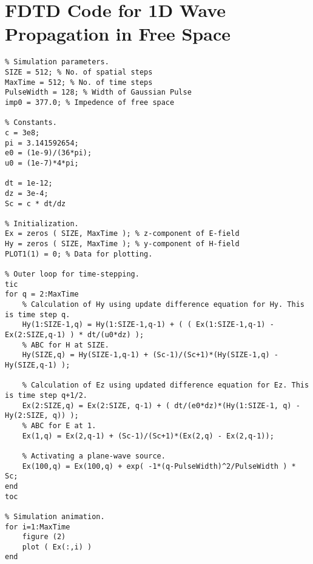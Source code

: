 \chapter{FDTD Code for 1D Wave Propagation in Free Space}
\label{App:1DFDTDFreeSpaceMatlab}
\begin{lstlisting}
% Simulation parameters.
SIZE = 512; % No. of spatial steps
MaxTime = 512; % No. of time steps
PulseWidth = 128; % Width of Gaussian Pulse
imp0 = 377.0; % Impedence of free space

% Constants.
c = 3e8;
pi = 3.141592654;
e0 = (1e-9)/(36*pi);
u0 = (1e-7)*4*pi;

dt = 1e-12;
dz = 3e-4;
Sc = c * dt/dz

% Initialization.
Ex = zeros ( SIZE, MaxTime ); % z-component of E-field
Hy = zeros ( SIZE, MaxTime ); % y-component of H-field
PLOT1(1) = 0; % Data for plotting.

% Outer loop for time-stepping.
tic
for q = 2:MaxTime
    % Calculation of Hy using update difference equation for Hy. This is time step q.
    Hy(1:SIZE-1,q) = Hy(1:SIZE-1,q-1) + ( ( Ex(1:SIZE-1,q-1) - Ex(2:SIZE,q-1) ) * dt/(u0*dz) );
    % ABC for H at SIZE.
    Hy(SIZE,q) = Hy(SIZE-1,q-1) + (Sc-1)/(Sc+1)*(Hy(SIZE-1,q) - Hy(SIZE,q-1) );
    
    % Calculation of Ez using updated difference equation for Ez. This is time step q+1/2.
    Ex(2:SIZE,q) = Ex(2:SIZE, q-1) + ( dt/(e0*dz)*(Hy(1:SIZE-1, q) - Hy(2:SIZE, q)) );
    % ABC for E at 1.
    Ex(1,q) = Ex(2,q-1) + (Sc-1)/(Sc+1)*(Ex(2,q) - Ex(2,q-1));
    
    % Activating a plane-wave source.
    Ex(100,q) = Ex(100,q) + exp( -1*(q-PulseWidth)^2/PulseWidth ) * Sc;
end
toc

% Simulation animation.
for i=1:MaxTime
    figure (2)
    plot ( Ex(:,i) )
end

\end{lstlisting}

